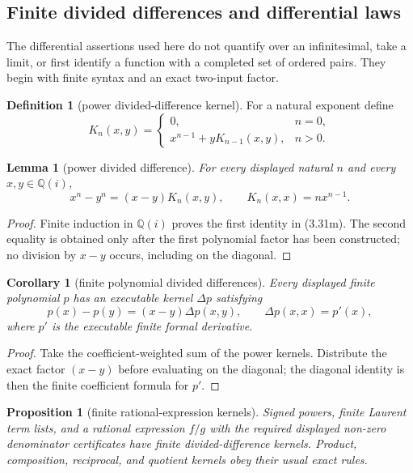 \documentclass[10pt]{article}
\newtheorem{lemma}[theorem]{Lemma}
\newtheorem{proposition}[theorem]{Proposition}
\newtheorem{corollary}[theorem]{Corollary}
\theoremstyle{definition}
\newtheorem{definition}[theorem]{Definition}
\theoremstyle{remark}
\newcommand{\Qi}{\mathbb{Q}(i)}
\begin{document}
\subsection{Finite divided differences and differential laws}

The differential assertions used here do not quantify over an infinitesimal,
take a limit, or first identify a function with a completed set of ordered
pairs.  They begin with finite syntax and an exact two-input factor.

\begin{definition}[power divided-difference kernel]
For a natural exponent define
\[
 K_n(x,y)=
 \begin{cases}
  0,&n=0,\\
 x^{n-1}+yK_{n-1}(x,y),&n>0.
 \end{cases}
\]
\end{definition}

\begin{lemma}[power divided difference]
For every displayed natural $n$ and every $x,y\in\Qi$,
\[
 x^n-y^n=(x-y)K_n(x,y),
 \qquad K_n(x,x)=n x^{n-1}.
 \tag{3.31m}
\]
\end{lemma}

\begin{proof}
Finite induction in $\Qi$ proves the first identity in (3.31m).  The second
equality is obtained only after the first polynomial factor has
been constructed; no division by $x-y$ occurs, including on the diagonal.
\end{proof}

\begin{corollary}[finite polynomial divided differences]
\label{lem:finite-divided-differences}
Every displayed finite polynomial $p$ has an executable kernel $\Delta p$
satisfying
\[
 p(x)-p(y)=(x-y)\Delta p(x,y),
 \qquad \Delta p(x,x)=p'(x),
 \tag{3.31n}
\]
where $p'$ is the executable finite formal derivative.
\end{corollary}

\begin{proof}
Take the coefficient-weighted sum of the power kernels.  Distribute the exact
factor $(x-y)$ before evaluating on the diagonal; the diagonal identity is
then the finite coefficient formula for $p'$.
\end{proof}

\begin{proposition}[finite rational-expression kernels]
Signed powers, finite Laurent term lists, and a rational expression $f/g$
with the required displayed non-zero denominator certificates have finite
divided-difference kernels.  Product, composition, reciprocal, and quotient
kernels obey their usual exact rules.
\end{proposition}
\end{document}
